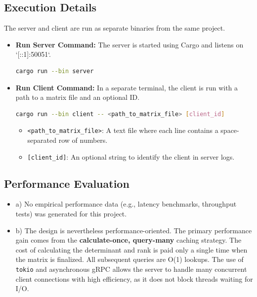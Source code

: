 \documentclass{article}
\begin{document}
\subsection{Execution Details}
The server and client are run as separate binaries from the same project.
\begin{itemize}
    \item \textbf{Run Server Command:} The server is started using Cargo and listens on `[::1]:50051`.
    \begin{lstlisting}[language=bash]
cargo run --bin server
\end{lstlisting}
    \item \textbf{Run Client Command:} In a separate terminal, the client is run with a path to a matrix file and an optional ID.
    \begin{lstlisting}[language=bash]
cargo run --bin client -- <path_to_matrix_file> [client_id]
\end{lstlisting}
    \begin{itemize}
        \item \texttt{<path\_to\_matrix\_file>}: A text file where each line contains a space-separated row of numbers.
        \item \texttt{[client\_id]}: An optional string to identify the client in server logs.
    \end{itemize}
\end{itemize}

\subsection{Performance Evaluation}
\begin{itemize}
    \item a) No empirical performance data (e.g., latency benchmarks, throughput tests) was generated for this project.
    \item b) The design is nevertheless performance-oriented. The primary performance gain comes from the \textbf{calculate-once, query-many} caching strategy. The cost of calculating the determinant and rank is paid only a single time when the matrix is finalized. All subsequent queries are O(1) lookups. The use of \texttt{tokio} and asynchronous gRPC allows the server to handle many concurrent client connections with high efficiency, as it does not block threads waiting for I/O.
\end{itemize}
\end{document}
